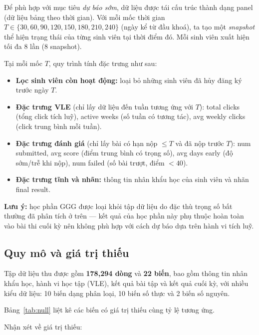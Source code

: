 \documentclass[a4paper]{article}
\newcommand{\code}[1]{{\ttfamily\def\_{\textunderscore\discretionary{}{}{}}#1}}
\def\code#1{#1}%
\def\_{ }%
\begin{document}
Để phù hợp với mục tiêu \textit{dự báo sớm}, dữ liệu được tái cấu trúc thành
dạng panel (dữ liệu bảng theo thời gian). Với mỗi mốc thời gian
$T \in \{30, 60, 90, 120, 150, 180, 210, 240\}$ (ngày kể từ đầu khoá), ta tạo
một \textit{snapshot} thể hiện trạng thái của từng sinh viên tại thời điểm đó.
Mỗi sinh viên xuất hiện tối đa 8 lần (8 snapshot).

Tại mỗi mốc $T$, quy trình tính đặc trưng như sau:

\begin{itemize}[leftmargin=*]
  \item \textbf{Lọc sinh viên còn hoạt động:} loại bỏ những sinh viên đã hủy
        đăng ký trước ngày $T$.
  \item \textbf{Đặc trưng VLE} (chỉ lấy dữ liệu đến tuần tương ứng với $T$):
        \code{total\_clicks} (tổng click tích luỹ), \code{active\_weeks} (số
        tuần có tương tác), \code{avg\_weekly\_clicks} (click trung bình mỗi
        tuần).
  \item \textbf{Đặc trưng đánh giá} (chỉ lấy bài có hạn nộp $\le T$ và đã nộp
        trước $T$): \code{num\_submitted}, \code{avg\_score} (điểm trung bình có
        trọng số), \code{avg\_days\_early} (độ sớm/trễ khi nộp),
        \code{num\_failed} (số bài trượt, điểm $< 40$).
  \item \textbf{Đặc trưng tĩnh và nhãn:} thông tin nhân khẩu học của sinh viên
        và nhãn \code{final\_result}.
\end{itemize}

\textbf{Lưu ý:} học phần GGG được loại khỏi tập dữ liệu do đặc thù trọng số bất
thường đã phân tích ở trên --- kết quả của học phần này phụ thuộc hoàn toàn vào
bài thi cuối kỳ nên không phù hợp với cách dự báo dựa trên hành vi tích luỹ.

\subsection{Quy mô và giá trị thiếu}

Tập dữ liệu thu được gồm \textbf{178{,}294 dòng} và \textbf{22 biến}, bao gồm
thông tin nhân khẩu học, hành vi học tập (VLE), kết quả bài tập và kết quả cuối
kỳ, với nhiều kiểu dữ liệu: 10 biến dạng phân loại, 10 biến số thực và 2 biến số
nguyên.

Bảng~\ref{tab:null} liệt kê các biến có giá trị thiếu cùng tỷ lệ tương ứng.



Nhận xét về giá trị thiếu:
\end{document}
